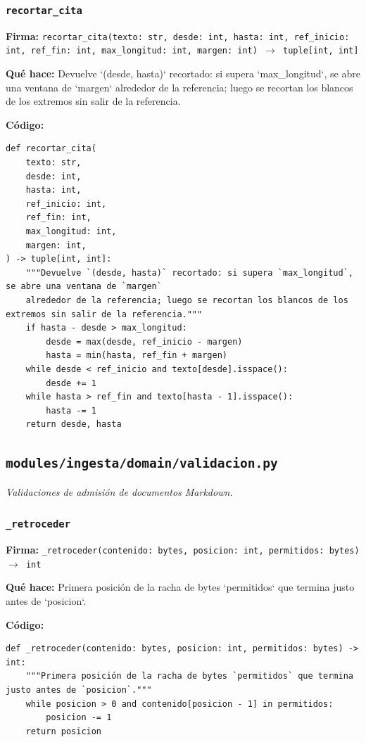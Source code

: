 \documentclass[11pt,a4paper]{article}
\begin{document}
\subsubsection*{\texttt{recortar\_cita}}
\textbf{Firma:} \texttt{recortar\_cita(texto: str, desde: int, hasta: int, ref\_inicio: int, ref\_fin: int, max\_longitud: int, margen: int) $\rightarrow$ tuple[int, int]}

\textbf{Qué hace:} Devuelve `(desde, hasta)` recortado: si supera `max\_longitud`, se abre una ventana de `margen`
alrededor de la referencia; luego se recortan los blancos de los extremos sin salir de la referencia.

\textbf{Código:}
\begin{lstlisting}
def recortar_cita(
    texto: str,
    desde: int,
    hasta: int,
    ref_inicio: int,
    ref_fin: int,
    max_longitud: int,
    margen: int,
) -> tuple[int, int]:
    """Devuelve `(desde, hasta)` recortado: si supera `max_longitud`, se abre una ventana de `margen`
    alrededor de la referencia; luego se recortan los blancos de los extremos sin salir de la referencia."""
    if hasta - desde > max_longitud:
        desde = max(desde, ref_inicio - margen)
        hasta = min(hasta, ref_fin + margen)
    while desde < ref_inicio and texto[desde].isspace():
        desde += 1
    while hasta > ref_fin and texto[hasta - 1].isspace():
        hasta -= 1
    return desde, hasta
\end{lstlisting}

\subsection{\texttt{modules/ingesta/domain/validacion.py}}
\textit{Validaciones de admisión de documentos Markdown.}

\subsubsection*{\texttt{\_retroceder}}
\textbf{Firma:} \texttt{\_retroceder(contenido: bytes, posicion: int, permitidos: bytes) $\rightarrow$ int}

\textbf{Qué hace:} Primera posición de la racha de bytes `permitidos` que termina justo antes de `posicion`.

\textbf{Código:}
\begin{lstlisting}
def _retroceder(contenido: bytes, posicion: int, permitidos: bytes) -> int:
    """Primera posición de la racha de bytes `permitidos` que termina justo antes de `posicion`."""
    while posicion > 0 and contenido[posicion - 1] in permitidos:
        posicion -= 1
    return posicion
\end{lstlisting}
\end{document}
